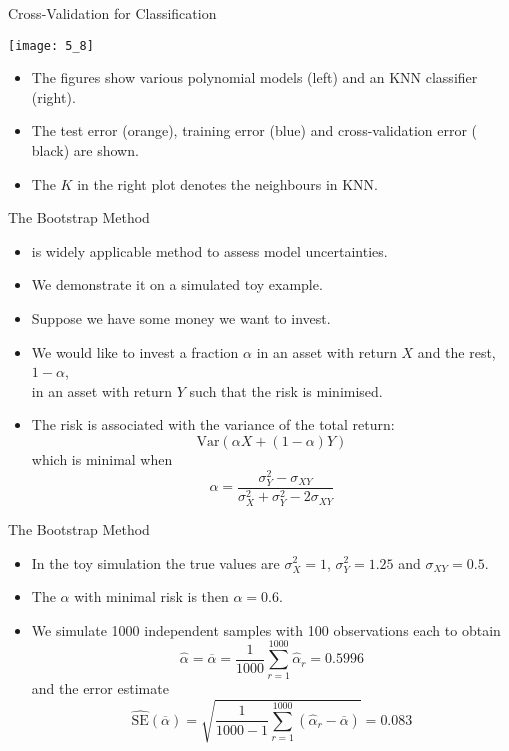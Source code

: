 \documentclass[mathserif, aspectratio=169]{beamer}
\begin{document}
\begin{frame}{Cross-Validation for Classification}
	\vspace{-10mm}
	\begin{center}
		\texttt{[image: 5\_8]}
	\end{center}
	\vspace{-7mm}
	\begin{itemize}
		\item The figures show various polynomial models (left) and an KNN classifier (right).
		\item The test error ({\orange orange}), training error ({\blue blue}) and
			cross-validation error ({\color{black} black}) are shown.
		\item The $K$ in the right plot denotes the neighbours in KNN.
	\end{itemize}
\end{frame}

\begin{frame}{The Bootstrap Method}
	\begin{itemize}
		\item {} is widely applicable method to assess model uncertainties.
		\item We demonstrate it on a simulated toy example.
		\item Suppose we have some money we want to invest.
		\item We would like to invest a fraction $\alpha$ in an asset with return $X$ 
			and the rest, $1 - \alpha$,\\ in an asset with return $Y$ such that the risk is minimised.
		\item The risk is associated with the variance of the total return:
			\[ \text{Var}\left(\alpha X + (1 - \alpha) Y \right) \]
			which is minimal when
			\[
				\alpha = 
				\frac{\sigma^2_Y - \sigma_{XY}}
				{\sigma^2_X + \sigma^2_Y - 2\sigma_{XY}}
			\]
	\end{itemize}
\end{frame}

\begin{frame}{The Bootstrap Method}
	\begin{itemize}
		\item In the toy simulation the true values are $\sigma^2_X = 1$,
			$\sigma^2_Y = 1.25$ and $\sigma_{XY} = 0.5$.
		\item The $\alpha$ with minimal risk  is then $\alpha = 0.6$.
		\item We simulate 1000 independent samples with 100 observations each to obtain
			\[
				\hat{\alpha} = \overline{\alpha} = \frac{1}{1000}
				\sum_{r=1}^{1000} \hat{\alpha}_r = 0.5996
			\]
			and the error estimate
			\[
				\widehat{\text{SE}}(\overline{\alpha}) =
				\sqrt{
					\frac{1}{1000 - 1}
					\sum_{r=1}^{1000} \left( \hat{\alpha}_r - \overline{\alpha}\right)
				}
				= 0.083
			\]
	\end{itemize}
\end{frame}
\end{document}
